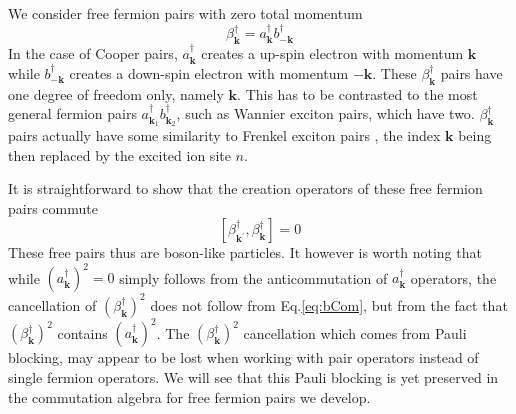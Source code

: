 \documentclass[epj]{svjour}
\newcommand{\vk}{\ensuremath{\mathbf{k}}}
\begin{document}
We consider free fermion pairs with zero total
momentum 
\begin{equation}
\beta^{\dagger}_\vk=a^{\dagger}_{\mathbf{k} }b^{\dagger}_{-\mathbf{k} }
\end{equation}
 In the case of Cooper pairs, $a^{\dagger}_{\mathbf{k} }$ creates a  up-spin electron with momentum $\mathbf{k}$ while $b^{\dagger}_{\mathbf{-k} }$ creates a down-spin electron with momentum $\mathbf{-k}$. These $\beta^{\dagger}_\vk$ pairs have one degree of freedom
only, namely $\mathbf{k}$. This has to be  contrasted to the
most general fermion pairs $a^{\dagger}_{\mathbf{k} _1}b^{\dagger}_{\mathbf{k%
} _2}$, such as Wannier exciton pairs, which have two. $\beta^{\dagger}_\vk$ pairs actually have  some similarity to Frenkel exciton pairs \cite{frenkel}, the index $\mathbf{k}$ being then replaced by the excited ion site $n$. 

It is straightforward to show that the creation operators of these free fermion pairs commute 
\begin{equation}  \label{eq:bCom}
\left[\beta^{\dagger}_{\mathbf{k} ^{\prime}},\beta^{\dagger}_{\mathbf{k} }%
\right]  =0
\end{equation}
These free pairs thus are boson-like  particles.  It however is worth noting that while ${(a^{\dagger}_{\mathbf{k}})} ^2=0$
simply follows from the anticommutation of $a^{\dagger}_{\mathbf{k} }$
operators, the cancellation of ${(\beta^{\dagger}_{\mathbf{k}})} ^2$ does not follow from Eq.\eqref{eq:bCom}, but from the fact that ${(\beta^{\dagger}_{\mathbf{k}})} ^2$  contains ${(a^{\dagger}_{\mathbf{k}})} ^2$. The ${(\beta^{\dagger}_{\mathbf{k}})} ^2$  cancellation which comes from Pauli blocking, may appear  to be lost
when working with pair operators instead of  single fermion operators. We will see that this Pauli blocking is yet preserved in the commutation algebra for
free fermion pairs we develop.
\end{document}
